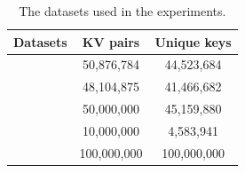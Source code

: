 
\begin{table}[t]
	\caption{The datasets used in the experiments.}
	\vspace{-1.5em}
	\label{table:exp_data_sets}
	\centering
\begin{tabular}{|c|c|c|}
	\hline
	Datasets & KV pairs & Unique keys\\ \hline
	\dstwitter &50,876,784 & 44,523,684\\ \hline
	\dsreddit & 48,104,875 & 41,466,682 \\ \hline
	\dstpch &50,000,000 & 45,159,880\\ \hline
	\dsali &10,000,000 & 4,583,941\\ \hline
	\dsrandom & 100,000,000& 100,000,000 \\ \hline
\end{tabular}
\end{table}



